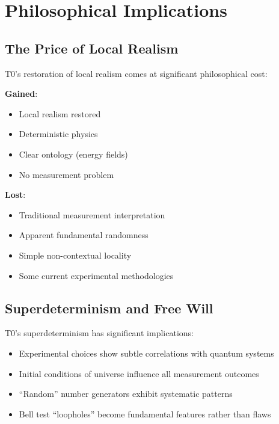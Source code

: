 	\section{Philosophical Implications}
	
	\subsection{The Price of Local Realism}
	
	T0's restoration of local realism comes at significant philosophical cost:
	
	\begin{tcolorbox}[colback=purple!5!white,colframe=purple!75!black,title=Philosophical Trade-offs]
		\textbf{Gained}:
		\begin{itemize}
			\item Local realism restored
			\item Deterministic physics
			\item Clear ontology (energy fields)
			\item No measurement problem
		\end{itemize}
		
		\textbf{Lost}:
		\begin{itemize}
			\item Traditional measurement interpretation
			\item Apparent fundamental randomness
			\item Simple non-contextual locality
			\item Some current experimental methodologies
		\end{itemize}
	\end{tcolorbox}
	
	\subsection{Superdeterminism and Free Will}
	
	T0's superdeterminism has significant implications:
	
	\begin{itemize}
		\item Experimental choices show subtle correlations with quantum systems
		\item Initial conditions of universe influence all measurement outcomes
		\item ``Random'' number generators exhibit systematic patterns
		\item Bell test ``loopholes'' become fundamental features rather than flaws
	\end{itemize}
